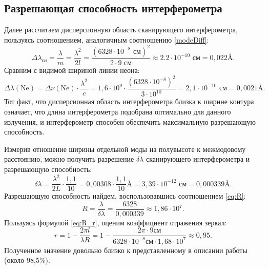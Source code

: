 \subsection{Разрешающая способность интерферометра}
Далее рассчитаем дисперсионную область сканирующего интерферометра, пользуясь соотношением, аналогичным соотношению \eqref{modeDiff}:
\[
\Delta \lambda_{\text{си}} = \frac {\lambda} {m} = \frac {\lambda ^2}{2l} = \frac{(6328 \cdot 10^{-8} \text{ см})^2}{2 \cdot 9 \text{ см}} \approx 2.2 \cdot 10^{-10} \text{ см} = 0,022 \si{\angstrom}.
\]
Сравним с видимой шириной линии неона: 
\[
\Delta \lambda (\text{Ne}) = \Delta \nu (\text{Ne}) \cdot \frac {\lambda^2}{c} =
1,6 \cdot 10^9 \cdot \frac{(6328 \cdot 10^{-8})^2}{3 \cdot 10^{10}} = 2,1 \cdot 10^{-10} \text{ см} = 0,0021 \si{\angstrom}.
\]
Тот факт, что дисперсионная область интерферометра близка к ширине контура означает, что длина интерферометра подобрана оптимально для данного излучения, и интерферометр способен обеспечить максимальную разрешающую способность.

Измерив отношение ширины отдельной моды на полувысоте к межмодовому расстоянию, можно получить разрешение $\delta \lambda$ сканирующего интерферометра и разрешающую способность:
\[
\delta \lambda = \frac{\lambda^2}{2 L} \cdot \frac{1,1}{10} = 0,00308 \cdot \frac{1,1}{10} \si{\angstrom} = 3,39 \cdot 10^{-12}\text{ см} = 0,000339 \si{\angstrom}.
\]
Разрешающую способность найдем, воспользовавшись соотношением \eqref{eq:R}:
\[
R = \frac{\lambda}{\delta \lambda} = \frac{6328}{0,000339} \approx 1,86 \cdot 10^7.
\]
Пользуясь формулой \eqref{eq:R_r}, оценим коэффициент отражения зеркал:
\[
r = 1 - \frac{2 \pi l} {\lambda R} = 
1 - \frac{2 \pi \cdot 9 \text{см}} {6328 \cdot 10^{-8} \text{см} \cdot 1,68 \cdot 10^7 } \approx 0,95.
\]
Полученное значение довольно близко к представленному в описании работы (около 98,5\%).
\newpage


